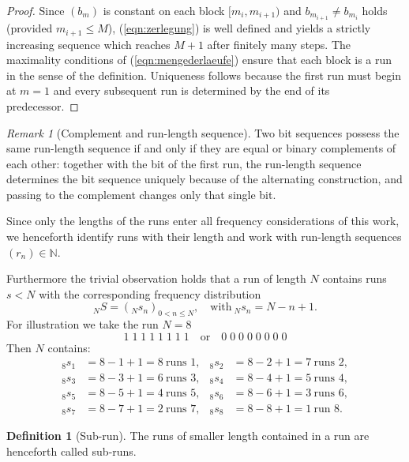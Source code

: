 \documentclass[11pt,a4paper]{scrartcl}
\theoremstyle{plain}
\theoremstyle{definition}
\newtheorem{defi}[satz]{Definition}
\theoremstyle{remark}
\newtheorem{bem}[satz]{Remark}
\begin{document}
\begin{proof}
Since $(b_m)$ is constant on each block $[m_i,m_{i+1})$ and
$b_{m_{i+1}}\neq b_{m_i}$ holds (provided $m_{i+1}\leq M$),
(\ref{eqn:zerlegung}) is well defined and yields a strictly
increasing sequence which reaches $M+1$ after finitely many steps.
The maximality conditions of (\ref{eqn:mengederlaeufe}) ensure that
each block is a run in the sense of the definition. Uniqueness
follows because the first run must begin at $m=1$ and every
subsequent run is determined by the end of its predecessor.
\end{proof}

\begin{bem}[Complement and run-length sequence]\label{bem:komplement}
Two bit sequences possess the same run-length sequence if and only if
they are equal or binary complements of each other: together with the
bit of the first run, the run-length sequence determines the bit
sequence uniquely because of the alternating construction, and
passing to the complement changes only that single bit.
\end{bem}

\noindent Since only the lengths of the runs enter all frequency
considerations of this work, we henceforth identify runs with their
length and work with run-length sequences $(r_n)\in\mathbb N$.

Furthermore the trivial observation holds that a run of length $N$
contains runs $s<N$ with the corresponding frequency distribution
\begin{equation}\label{eqn:haufigkeitenteillaeufe}
  _NS=(_Ns_n)_{0<n\leq N},\quad\text{with}\ _Ns_n=N-n+1.
\end{equation}
For illustration we take the run $N=8$
\begin{equation}\label{eqn:teillaufindemlauf}
  1\;1\;1\;1\;1\;1\;1\;1\quad\text{or}\quad 0\;0\;0\;0\;0\;0\;0\;0
\end{equation}
Then $N$ contains:
\begin{align*}
  {}_8s_1&=8-1+1=8\ \text{runs } 1, & {}_8s_2&=8-2+1=7\ \text{runs } 2,\\
  {}_8s_3&=8-3+1=6\ \text{runs } 3, & {}_8s_4&=8-4+1=5\ \text{runs } 4,\\
  {}_8s_5&=8-5+1=4\ \text{runs } 5, & {}_8s_6&=8-6+1=3\ \text{runs } 6,\\
  {}_8s_7&=8-7+1=2\ \text{runs } 7, & {}_8s_8&=8-8+1=1\ \text{run } 8.
\end{align*}

\begin{defi}[Sub-run]\label{defi:teillauf}
The runs of smaller length contained in a run are henceforth called
sub-runs.
\end{defi}
\end{document}
